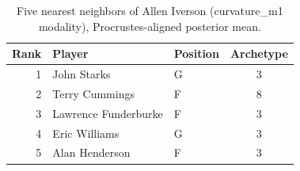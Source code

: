 \begin{table}[htbp]
  \centering\small
  \begin{tabular}{rllc}
    \toprule
    Rank & Player & Position & Archetype \\
    \midrule
    1 & John Starks & G & 3 \\
    2 & Terry Cummings & F & 8 \\
    3 & Lawrence Funderburke & F & 3 \\
    4 & Eric Williams & G & 3 \\
    5 & Alan Henderson & F & 3 \\
    \bottomrule
  \end{tabular}
  \caption{Five nearest neighbors of Allen Iverson (curvature_m1 modality), Procrustes-aligned posterior mean.}
  \label{tab:Allen_Iverson_neighbors_curvature_m1}
\end{table}

